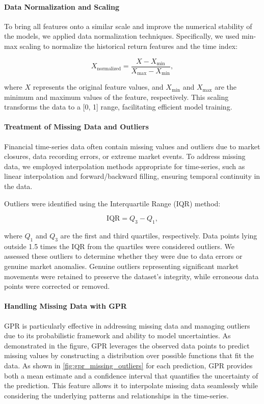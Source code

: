 \paragraph{Data Normalization and Scaling}

To bring all features onto a similar scale and improve the numerical stability of the models, we applied data normalization techniques. Specifically, we used min-max scaling to normalize the historical return features and the time index:

\begin{equation}
    X_{\text{normalized}} = \frac{X - X_{\text{min}}}{X_{\text{max}} - X_{\text{min}}},
\end{equation}

where $X$ represents the original feature values, and $X_{\text{min}}$ and $X_{\text{max}}$ are the minimum and maximum values of the feature, respectively. This scaling transforms the data to a [0, 1] range, facilitating efficient model training.

\paragraph{Treatment of Missing Data and Outliers}

Financial time-series data often contain missing values and outliers due to market closures, data recording errors, or extreme market events. To address missing data, we employed interpolation methods appropriate for time-series, such as linear interpolation and forward/backward filling, ensuring temporal continuity in the data.

Outliers were identified using the Interquartile Range (IQR) method:

\begin{equation}
    \text{IQR} = Q_3 - Q_1,
\end{equation}

where $Q_1$ and $Q_3$ are the first and third quartiles, respectively. Data points lying outside 1.5 times the IQR from the quartiles were considered outliers. We assessed these outliers to determine whether they were due to data errors or genuine market anomalies. Genuine outliers representing significant market movements were retained to preserve the dataset's integrity, while erroneous data points were corrected or removed.

\paragraph{Handling Missing Data with GPR}
\ac{GPR} is particularly effective in addressing missing data and managing outliers due to its probabilistic framework and ability to model uncertainties. As demonstrated in the figure, GPR leverages the observed data points to predict missing values by constructing a distribution over possible functions that fit the data. 
As shown in \ref{fig:gpr_missing_outliers} for each prediction, GPR provides both a mean estimate and a confidence interval that quantifies the uncertainty of the prediction. This feature allows it to interpolate missing data seamlessly while considering the underlying patterns and relationships in the time-series.

